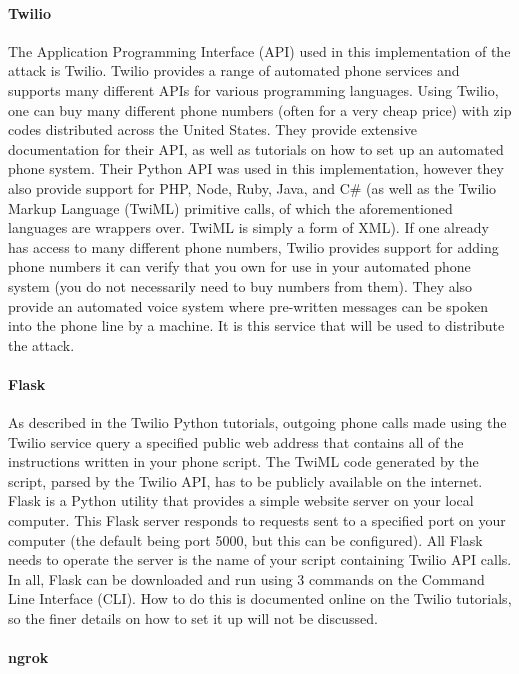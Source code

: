 \documentclass[10pt]{report}
\begin{document}
\paragraph{Twilio}
The Application Programming Interface (API) used in this implementation of the attack is Twilio. Twilio provides a range of automated phone services and supports many different APIs for various programming languages. Using Twilio, one can buy many different phone numbers (often for a very cheap price) with zip codes distributed across the United States. They provide extensive documentation for their API, as well as tutorials on how to set up an automated phone system. Their Python API was used in this implementation, however they also provide support for PHP, Node, Ruby, Java, and C\# (as well as the Twilio Markup Language (TwiML) primitive calls, of which the aforementioned languages are wrappers over. TwiML is simply a form of XML). If one already has access to many different phone numbers, Twilio provides support for adding phone numbers it can verify that you own for use in your automated phone system (you do not necessarily need to buy numbers from them). They also provide an automated voice system where pre-written messages can be spoken into the phone line by a machine. It is this service that will be used to distribute the attack.

\paragraph{Flask}

As described in the Twilio Python tutorials, outgoing phone calls made using the Twilio service query a specified public web address that contains all of the instructions written in your phone script. The TwiML code generated by the script, parsed by the Twilio API, has to be publicly available on the internet. Flask is a Python utility that provides a simple website server on your local computer. This Flask server responds to requests sent to a specified port on your computer (the default being port 5000, but this can be configured). All Flask needs to operate the server is the name of your script containing Twilio API calls. In all, Flask can be downloaded and run using 3 commands on the Command Line Interface (CLI). How to do this is documented online on the Twilio tutorials, so the finer details on how to set it up will not be discussed.

\paragraph{ngrok}
\end{document}
